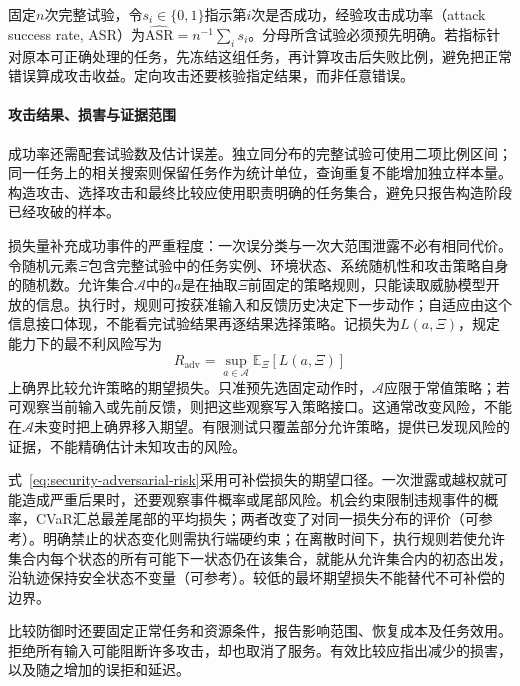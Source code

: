 固定$n$次完整试验，令$s_i\in\{0,1\}$指示第$i$次是否成功，经验攻击成功率（attack success rate, ASR）为$\widehat{\mathrm{ASR}}=n^{-1}\sum_i s_i$。分母所含试验必须预先明确。若指标针对原本可正确处理的任务，先冻结这组任务，再计算攻击后失败比例，避免把正常错误算成攻击收益。定向攻击还要核验指定结果，而非任意错误。

\paragraph{攻击结果、损害与证据范围}

成功率还需配套试验数及估计误差。独立同分布的完整试验可使用二项比例区间；同一任务上的相关搜索则保留任务作为统计单位，查询重复不能增加独立样本量。构造攻击、选择攻击和最终比较应使用职责明确的任务集合，避免只报告构造阶段已经攻破的样本。

损失量补充成功事件的严重程度：一次误分类与一次大范围泄露不必有相同代价。令随机元素$\Xi$包含完整试验中的任务实例、环境状态、系统随机性和攻击策略自身的随机数。允许集合$\mathcal A$中的$a$是在抽取$\Xi$前固定的策略规则，只能读取威胁模型开放的信息。执行时，规则可按获准输入和反馈历史决定下一步动作；自适应由这个信息接口体现，不能看完试验结果再逐结果选择策略。记损失为$L(a,\Xi)$，规定能力下的最不利风险写为
\begin{equation}
 R_{\mathrm{adv}}=\sup_{a\in\mathcal A}
 \mathbb E_{\Xi}[L(a,\Xi)]
 \label{eq:security-adversarial-risk}
\end{equation}
上确界比较允许策略的期望损失。只准预先选固定动作时，$\mathcal A$应限于常值策略；若可观察当前输入或先前反馈，则把这些观察写入策略接口。这通常改变风险，不能在$\mathcal A$未变时把上确界移入期望。有限测试只覆盖部分允许策略，提供已发现风险的证据，不能精确估计未知攻击的风险。

式~\eqref{eq:security-adversarial-risk}采用可补偿损失的期望口径。一次泄露或越权就可能造成严重后果时，还要观察事件概率或尾部风险。机会约束限制违规事件的概率，CVaR汇总最差尾部的平均损失；两者改变了对同一损失分布的评价（可参考）。明确禁止的状态变化则需执行端硬约束；在离散时间下，执行规则若使允许集合内每个状态的所有可能下一状态仍在该集合，就能从允许集合内的初态出发，沿轨迹保持安全状态不变量（可参考）。较低的最坏期望损失不能替代不可补偿的边界。

比较防御时还要固定正常任务和资源条件，报告影响范围、恢复成本及任务效用。拒绝所有输入可能阻断许多攻击，却也取消了服务。有效比较应指出减少的损害，以及随之增加的误拒和延迟。

